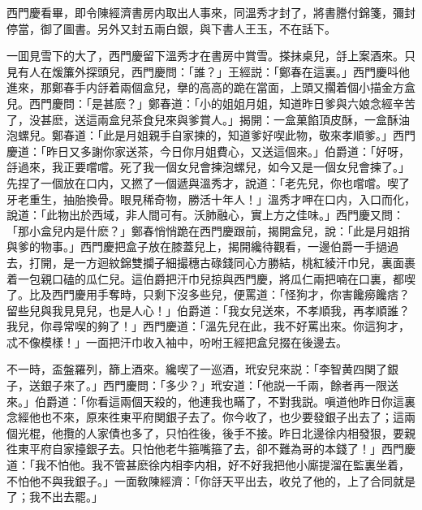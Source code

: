西門慶看畢，即令陳經濟書房内取出人事來，同溫秀才封了，將書謄付錦箋，彌封停當，御了圖書。另外又封五兩白銀，與下書人王玉，不在話下。

一囬見雪下的大了，西門慶留下溫秀才在書房中賞雪。搽抹桌兒，㧱上案酒來。只見有人在煖簾外探頭兒，西門慶問：「誰？」王經説：「鄭春在這裏。」西門慶呌他進來，那鄭春手内㧱着兩個盒兒，擧的高高的跪在當面，上頭又擱着個小描金方盒兒。西門慶問：「是甚麽？」鄭春道：「小的姐姐月姐，知道昨日爹與六娘念經辛苦了，没甚麽，送這兩盒兒茶食兒來與爹賞人。」揭開：一盒菓餡頂皮酥，一盒酥油泡螺兒。鄭春道：「此是月姐親手自家揀的，知道爹好喫此物，敬來孝順爹。」西門慶道：「昨日又多謝你家送茶，今日你月姐費心，又送這個來。」伯爵道：「好呀，㧱過來，我正要嚐嚐。死了我一個女兒會揀泡螺兒，如今又是一個女兒會揀了。」先捏了一個放在口内，又撚了一個遞與溫秀才，說道：「老先兒，你也嚐嚐。喫了牙老重生，抽胎換骨。眼見稀奇物，勝活十年人！」溫秀才呷在口内，入口而化，說道：「此物出於西域，非人間可有。沃肺融心，實上方之佳味。」西門慶又問：「那小盒兒内是什麽？」鄭春悄悄跪在西門慶跟前，揭開盒兒，說：「此是月姐捎與爹的物事。」西門慶把盒子放在膝蓋兒上，揭開纔待觀看，一邊伯爵一手撾過去，打開，是一方迴紋錦雙攔子細撮穗古碌錢同心方勝結，桃紅綾汗巾兒，裏面裹着一包親口磕的瓜仁兒。這伯爵把汗巾兒掠與西門慶，將瓜仁兩把喃在口裏，都喫了。比及西門慶用手奪時，只剩下沒多些兒，便罵道：「怪狗才，你害饞癆饞痞？留些兒與我見見兒，也是人心！」伯爵道：「我女兒送來，不孝順我，再孝順誰？我兒，你尋常喫的夠了！」西門慶道：「溫先兒在此，我不好罵出來。你這狗才，忒不像模樣！」一面把汗巾收入袖中，吩咐王經把盒兒掇在後邊去。

不一時，盃盤羅列，篩上酒來。纔喫了一巡酒，玳安兒來説：「李智黄四関了銀子，送銀子來了。」西門慶問：「多少？」玳安道：「他説一千兩，餘者再一限送來。」伯爵道：「你看這兩個天殺的，他連我也瞞了，不對我説。嗔道他昨日你這裏念經他也不來，原來徃東平府関銀子去了。你今收了，也少要發銀子出去了；這兩個光棍，他攬的人家債也多了，只怕徃後，後手不接。昨日北邊徐内相發狠，要親徃東平府自家擡銀子去。只怕他老牛箍嘴箍了去，卻不難為哥的本錢了！」西門慶道：「我不怕他。我不管甚麽徐内相李内相，好不好我把他小廝提溜在監裏坐着，不怕他不與我銀子。」一面敎陳經濟：「你㧱天平出去，收兑了他的，上了合同就是了；我不出去罷。」

